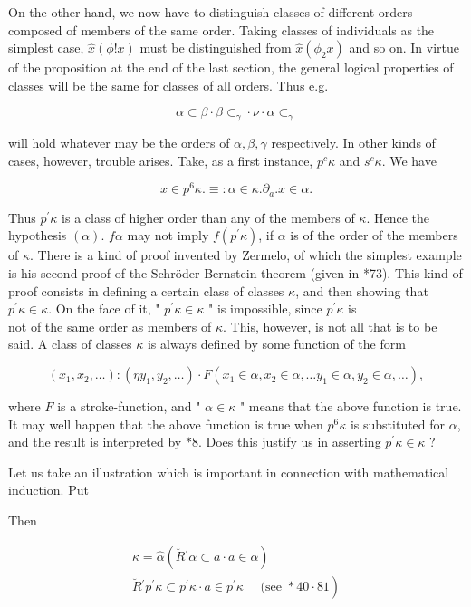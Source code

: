 \documentclass[10pt]{article}
\begin{document}
On the other hand, we now have to distinguish classes of different orders composed of members of the same order. Taking classes of individuals as the simplest case, $\hat{x}(\phi!x)$ must be distinguished from $\hat{x}\left(\phi_{2} x\right)$ and so on. In virtue of the proposition at the end of the last section, the general logical properties of classes will be the same for classes of all orders. Thus e.g.

$$
\alpha \subset \beta \cdot \beta \subset_{\gamma} \cdot \nu \cdot \alpha \subset_{\gamma}
$$

will hold whatever may be the orders of $\alpha, \beta, \gamma$ respectively. In other kinds of cases, however, trouble arises. Take, as a first instance, $p^{c} \kappa$ and $s^{c} \kappa$. We have

$$
x \in p^{6} \kappa . \equiv: \alpha \in \kappa . \partial_{a} . x \in \alpha .
$$

Thus $p^{\prime} \kappa$ is a class of higher order than any of the members of $\kappa$. Hence the hypothesis $(\alpha)$. $f \alpha$ may not imply $f\left(p^{\prime} \kappa\right)$, if $\alpha$ is of the order of the members of $\kappa$. There is a kind of proof invented by Zermelo, of which the simplest example is his second proof of the Schröder-Bernstein theorem (given in *73). This kind of proof consists in defining a certain class of classes $\kappa$, and then showing that $p^{\prime} \kappa \in \kappa$. On the face of it, " $p^{\prime} \kappa \in \kappa$ " is impossible, since $p^{\prime} \kappa$ is\\
not of the same order as members of $\kappa$. This, however, is not all that is to be said. A class of classes $\kappa$ is always defined by some function of the form

$$
\left(x_{1}, x_{2}, \ldots\right):\left(\eta y_{1}, y_{2}, \ldots\right) \cdot F\left(x_{1} \in \alpha, x_{2} \in \alpha, \ldots y_{1} \in \alpha, y_{2} \in \alpha, \ldots\right),
$$

where $F$ is a stroke-function, and " $\alpha \in \kappa$ " means that the above function is true. It may well happen that the above function is true when $p^{6} \kappa$ is substituted for $\alpha$, and the result is interpreted by $* 8$. Does this justify us in asserting $p^{\prime} \kappa \in \kappa$ ?

Let us take an illustration which is important in connection with mathematical induction. Put

Then

$$
\begin{gathered}
\kappa=\hat{\alpha}\left(\breve{R}{ }^{\prime} \alpha \subset a \cdot a \in \alpha\right) \\
\left.\breve{R}{ }^{\prime} p^{\prime} \kappa \subset p^{\prime} \kappa \cdot a \in p^{\prime} \kappa \quad \text { (see } * 40 \cdot 81\right)
\end{gathered}
$$
\end{document}
